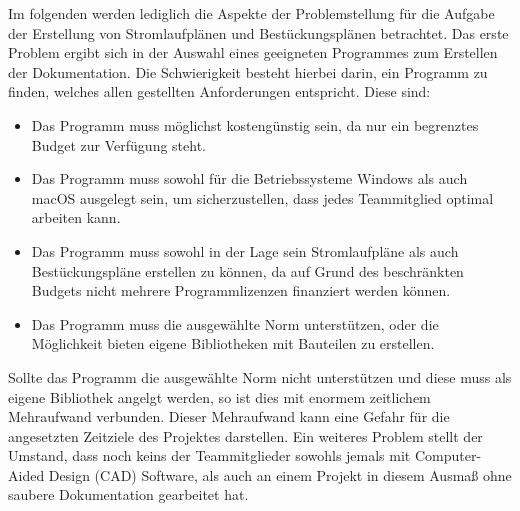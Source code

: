  Im folgenden werden lediglich die Aspekte der Problemstellung für die Aufgabe der Erstellung von Stromlaufplänen und Bestückungsplänen betrachtet. Das erste Problem ergibt sich in der Auswahl eines geeigneten Programmes zum Erstellen der Dokumentation. Die Schwierigkeit besteht hierbei darin, ein Programm zu finden, welches allen gestellten Anforderungen entspricht. Diese sind: 
\begin{itemize}
	\item Das Programm muss möglichst kostengünstig sein, da nur ein begrenztes Budget zur Verfügung steht.
	\item Das Programm muss sowohl für die Betriebssysteme Windows als auch \newline macOS ausgelegt sein, um sicherzustellen, dass jedes Teammitglied optimal arbeiten kann.
	\item Das Programm muss sowohl in der Lage sein Stromlaufpläne als auch Bestückungspläne erstellen zu können, da auf Grund des beschränkten Budgets nicht mehrere Programmlizenzen finanziert werden können.
	\item Das Programm muss die ausgewählte Norm unterstützen, oder die Möglichkeit bieten eigene Bibliotheken mit Bauteilen zu erstellen.
\end{itemize}   
Sollte das Programm die ausgewählte Norm nicht unterstützen und diese muss als eigene Bibliothek angelgt werden, so ist dies mit enormem zeitlichem Mehraufwand verbunden. Dieser Mehraufwand kann eine Gefahr für die angesetzten Zeitziele des Projektes darstellen. 
Ein weiteres Problem stellt der Umstand, dass noch keins der Teammitglieder sowohls jemals mit Computer-Aided Design (CAD) Software, als auch an einem Projekt in diesem Ausmaß  ohne saubere Dokumentation gearbeitet hat.

